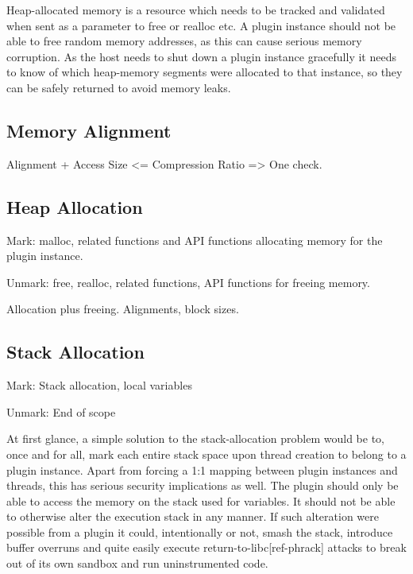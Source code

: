 Heap-allocated memory is a resource which needs to be tracked and validated when
sent as a parameter to free or realloc etc. A plugin instance should not be able
to free random memory addresses, as this can cause serious memory corruption. As
the host needs to shut down a plugin instance gracefully it needs to know of
which heap-memory segments were allocated to that instance, so they can be
safely returned to avoid memory leaks.

\subsection {Memory Alignment}

Alignment + Access Size <= Compression Ratio => One check.

\subsection {Heap Allocation}

Mark: malloc, related functions and API functions allocating memory for the
plugin instance.

Unmark: free, realloc, related functions, API functions for freeing memory.

Allocation plus freeing. Alignments, block sizes.

\subsection {Stack Allocation}

Mark: Stack allocation, local variables

Unmark: End of scope

At first glance, a simple solution to the stack-allocation problem would be to,
once and for all, mark each entire stack space upon thread creation to belong to
a plugin instance. Apart from forcing a 1:1 mapping between plugin instances and
threads, this has serious security implications as well. The plugin should only
be able to access the memory on the stack used for variables. It should not be
able to otherwise alter the execution stack in any manner. If such alteration
were possible from a plugin it could, intentionally or not, smash the stack,
introduce buffer overruns and quite easily execute return-to-libc[ref-phrack]
attacks to break out of its own sandbox and run uninstrumented code.


